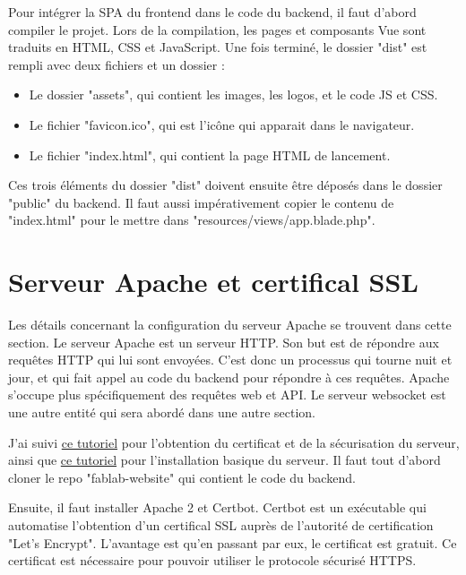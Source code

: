 \documentclass[
    iai, %
    eai, %
]{heig-tb}
\begin{document}
Pour intégrer la SPA du frontend dans le code du backend, il faut d'abord compiler le projet. Lors de la compilation, les pages et composants Vue sont traduits en HTML, CSS et JavaScript.
Une fois terminé, le dossier "dist" est rempli avec deux fichiers et un dossier :
\begin{itemize}
  \item Le dossier "assets", qui contient les images, les logos, et le code JS et CSS.
  \item Le fichier "favicon.ico", qui est l'icône qui apparait dans le navigateur.
  \item Le fichier "index.html", qui contient la page HTML de lancement.
\end{itemize}
\bigskip

Ces trois éléments du dossier "dist" doivent ensuite être déposés dans le dossier "public" du backend. Il faut aussi impérativement copier le contenu de "index.html" pour le mettre dans "resources/views/app.blade.php".

\newpage
\section{Serveur Apache et certifical SSL}
Les détails concernant la configuration du serveur Apache se trouvent dans cette section. Le serveur Apache est un serveur HTTP. Son but est de répondre aux requêtes HTTP qui lui sont envoyées. C'est donc un processus qui tourne nuit et jour, et qui fait appel au code du backend pour répondre à ces requêtes. Apache s'occupe plus spécifiquement des requêtes web et API. Le serveur websocket est une autre entité qui sera abordé dans une autre section.

J'ai suivi \href{https://www.digitalocean.com/community/tutorials/how-to-secure-apache-with-let-s-encrypt-on-ubuntu-20-04}{ce tutoriel} pour l'obtention du certificat et de la sécurisation du serveur, ainsi que \href{https://www.digitalocean.com/community/tutorials/how-to-set-up-apache-virtual-hosts-on-ubuntu-18-04}{ce tutoriel} pour l'installation basique du serveur.
Il faut tout d'abord cloner le repo "fablab-website" qui contient le code du backend.

Ensuite, il faut installer Apache 2 et Certbot. Certbot est un exécutable qui automatise l'obtention d'un certifical SSL auprès de l'autorité de certification "Let's Encrypt". L'avantage est qu'en passant par eux, le certificat est gratuit. Ce certificat est nécessaire pour pouvoir utiliser le protocole sécurisé HTTPS.
\end{document}
